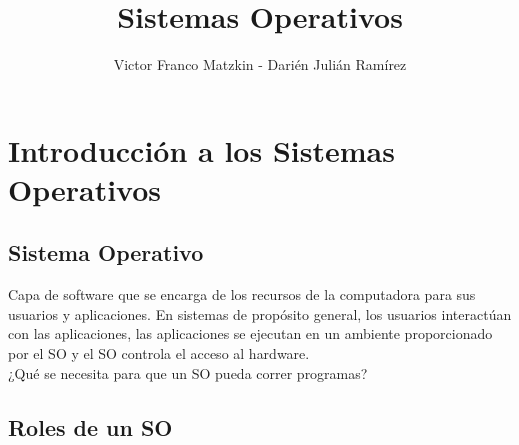 \documentclass[a4paper,10pt,spanish]{article}
\title{Sistemas Operativos} %
\author{Victor Franco Matzkin - Darién Julián Ramírez} %
\date{\empty} %
\begin{document}
\maketitle %

\tableofcontents

\clearpage

\section{Introducción a los Sistemas Operativos}

\subsection{Sistema Operativo}

Capa de software que se encarga de los recursos de la computadora para sus usuarios y aplicaciones. En sistemas de propósito general, los usuarios interactúan con las aplicaciones, las aplicaciones se ejecutan en un ambiente proporcionado por el SO y el SO controla el acceso al hardware. \\

¿Qué se necesita para que un SO pueda correr programas? \\

\subsection{Roles de un SO}
\end{document}
